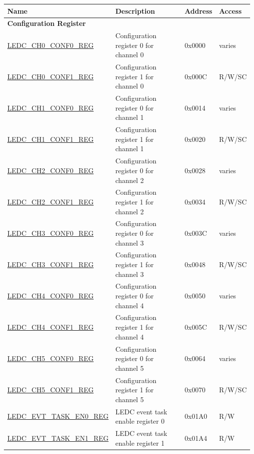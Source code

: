 \begin{longtable}{ | m{6cm} | p{6.7cm} | p{1.3cm} | p{1.5cm} | }
\hline\rowcolor{lightgray}
Name & Description &  Address & Access \\ \hline
\endhead
\multicolumn{4}{|l|}{\textbf{Configuration Register}} \\ \hline
\hyperref[regdesc:LEDCCHNCONF0REG]{LEDC\_CH0\_CONF0\_REG} & Configuration register 0 for channel 0 & 0x0000 & varies \\ \hline
\hyperref[regdesc:LEDCCHNCONF1REG]{LEDC\_CH0\_CONF1\_REG} & Configuration register 1 for channel 0 & 0x000C & R/W/SC \\ \hline
\hyperref[regdesc:LEDCCHNCONF0REG]{LEDC\_CH1\_CONF0\_REG} & Configuration register 0 for channel 1 & 0x0014 & varies \\ \hline
\hyperref[regdesc:LEDCCHNCONF1REG]{LEDC\_CH1\_CONF1\_REG} & Configuration register 1 for channel 1 & 0x0020 & R/W/SC \\ \hline
\hyperref[regdesc:LEDCCHNCONF0REG]{LEDC\_CH2\_CONF0\_REG} & Configuration register 0 for channel 2 & 0x0028 & varies \\ \hline
\hyperref[regdesc:LEDCCHNCONF1REG]{LEDC\_CH2\_CONF1\_REG} & Configuration register 1 for channel 2 & 0x0034 & R/W/SC \\ \hline
\hyperref[regdesc:LEDCCHNCONF0REG]{LEDC\_CH3\_CONF0\_REG} & Configuration register 0 for channel 3 & 0x003C & varies \\ \hline
\hyperref[regdesc:LEDCCHNCONF1REG]{LEDC\_CH3\_CONF1\_REG} & Configuration register 1 for channel 3 & 0x0048 & R/W/SC \\ \hline
\hyperref[regdesc:LEDCCHNCONF0REG]{LEDC\_CH4\_CONF0\_REG} & Configuration register 0 for channel 4 & 0x0050 & varies \\ \hline
\hyperref[regdesc:LEDCCHNCONF1REG]{LEDC\_CH4\_CONF1\_REG} & Configuration register 1 for channel 4 & 0x005C & R/W/SC \\ \hline
\hyperref[regdesc:LEDCCHNCONF0REG]{LEDC\_CH5\_CONF0\_REG} & Configuration register 0 for channel 5 & 0x0064 & varies \\ \hline
\hyperref[regdesc:LEDCCHNCONF1REG]{LEDC\_CH5\_CONF1\_REG} & Configuration register 1 for channel 5 & 0x0070 & R/W/SC \\ \hline
\hyperref[regdesc:LEDCEVTTASKEN0REG]{LEDC\_EVT\_TASK\_EN0\_REG} & LEDC event task enable register 0 & 0x01A0 & R/W \\ \hline
\hyperref[regdesc:LEDCEVTTASKEN1REG]{LEDC\_EVT\_TASK\_EN1\_REG} & LEDC event task enable register 1 & 0x01A4 & R/W \\ \hline

\end{longtable}
